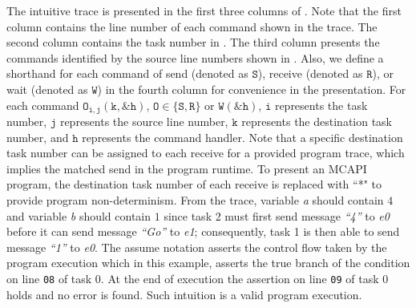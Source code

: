 The intuitive trace is presented in the first three columns of . Note that the first column contains the line number of each command shown in the trace. The second column contains the task number in . The third column presents the commands identified by the source line numbers shown in . Also, we define a shorthand for each command of send (denoted as $\mathtt{S}$), receive (denoted as $\mathtt{R}$), or wait (denoted as $\mathtt{W}$) in the fourth column for convenience in the presentation. For each command $\mathtt{O_{i,j}(k,\&h)}$, $\mathtt{O \in \{S,R\}}$ or $\mathtt{W(\&h)}$, $\mathtt{i}$ represents the task number, $\mathtt{j}$ represents the source line number, $\mathtt{k}$ represents the destination task number, and $\mathtt{h}$ represents the command handler. Note that a specific destination task number can be assigned to each receive for a provided program trace, which implies the matched send in the program runtime. To present an MCAPI program, the destination task number of each receive is replaced with ``*" to provide program non-determinism. From the trace, variable \textit{a} should contain $4$ and variable
\textit{b} should contain $1$ since task 2 must first send message \textit{``4''}
to \textit{e0} before it can send message \textit{``Go''} to \textit{e1};
consequently, task 1 is then able to send message \textit{``1''} to
\textit{e0}. The assume notation asserts the control flow taken by the program execution which in this example, asserts the true branch of the condition on line \texttt{08} of task 0.  At the end of execution the assertion on line \texttt{09}
of task 0 holds and no error is found. Such intuition is a valid
program execution.

